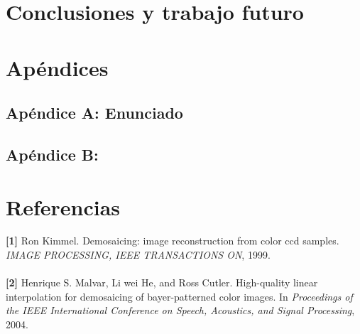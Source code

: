\documentclass[a4paper]{article}
\begin{document}
\newpage
\section{Conclusiones y trabajo futuro}





\section{Ap\'endices}
\subsection{Ap\'endice A: Enunciado} 


%

\subsection{Ap\'endice B:}
\newpage
\section{Referencias}
 
\textbf{[1]} Ron Kimmel. Demosaicing: image reconstruction from color ccd samples. \textit{IMAGE PROCESSING, IEEE TRANSACTIONS ON}, 1999. \\
\\

\textbf{[2]} Henrique S. Malvar, Li wei He, and Ross Cutler. High-quality linear interpolation for
demosaicing of bayer-patterned color images. In \textit{Proceedings of the IEEE International
Conference on Speech, Acoustics, and Signal Processing}, 2004.
\end{document}
